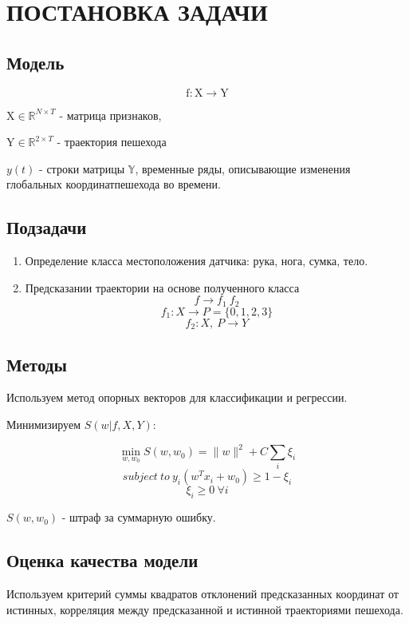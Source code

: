 \documentclass[letterpaper, 10 pt, conference]{ieeeconf}  %
\begin{document}
\section{ПОСТАНОВКА ЗАДАЧИ}

\subsection{Модель}

$$ \mathrm{f}  : \mathrm{X}   \rightarrow \mathrm{Y}$$

$\mathrm{X} \in \mathbb{R}^{N \times T} $ - матрица признаков, 

$\mathrm{Y} \in \mathbb{R}^{2 \times T}$  - траектория пешехода

$y(t)  $ - строки матрицы $\mathbb{Y}$,  временные ряды, описывающие изменения глобальных координатпешехода во времени.

\subsection{Подзадачи}

\begin{enumerate}
\item Определение класса местоположения датчика: рука, нога, сумка, тело.
\item  Предсказании траектории на основе полученного класса\[f \to f_1 ~ f_2\]
\[f_1: X \to P = \{0, 1, 2, 3\}\]
\[f_2: X, ~P \to Y\]
\end{enumerate}

\subsection{Методы}

Используем метод опорных векторов для классификации и регрессии.

Минимизируем $S(w|f, X, Y)$:

\[\min_{w, w_0}S(w, w_0) = \|w\|^2+C\sum_{i}\xi_i\]
\[subject~to~y_i(w^Tx_i+w_0)\geq 1-\xi_i\]
\[\xi_i \geq 0~\forall i\] 

$S(w, w_0)$ - штраф за суммарную ошибку.

\subsection{Оценка качества модели}

Используем критерий суммы квадратов отклонений предсказанных координат от истинных, корреляция между предсказанной и истинной траекториями пешехода.
\end{document}

